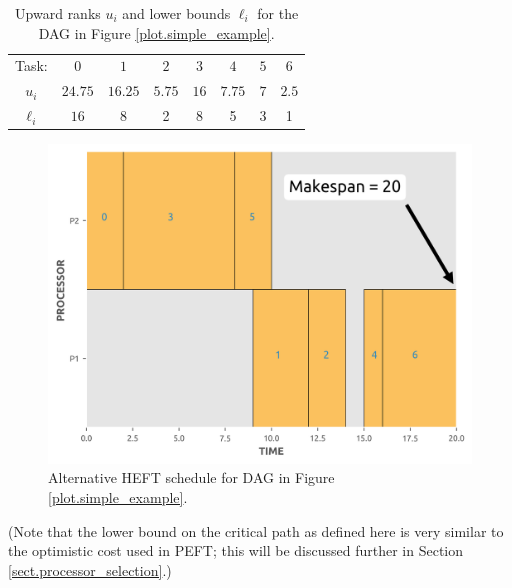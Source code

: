 \documentclass[12pt]{article}
\begin{document}
\begin{table}
	\caption{Upward ranks $u_i$ and lower bounds $\ell_i$ for the DAG in Figure \ref{plot.simple_example}.} 
	\begin{center}	
		\begin{tabular}{c c c c c c c c}
			\cmidrule{1-8}
			Task: & $0$ & $1$ & $2$ & $3$ & $4$ & $5$ & $6$\\
			\cmidrule{1-8}
			$u_i$ & $24.75$ & $16.25$ & $5.75$ & $16$ & $7.75$ & $7$ & $2.5$\\
			$\ell_i$ & $16$ & 8 & 2 & 8 & 5 & 3 & 1 \\
			\bottomrule
		\end{tabular}
		\label{tb.opt_example}
	\end{center}	
\end{table}

\begin{figure}
	\centering	
	\includegraphics[scale=0.8]{heft_schedule_example_LB.png}
	\caption{Alternative HEFT schedule for DAG in Figure \ref{plot.simple_example}.}	
	\label{plot.heft_schedule_example_LB}
\end{figure}

(Note that the lower bound on the critical path as defined here is very similar to the optimistic cost used in PEFT; this will be discussed further in Section \ref{sect.processor_selection}.)

\end{document}
